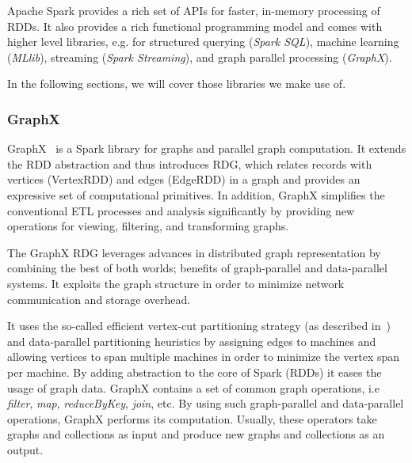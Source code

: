 Apache Spark provides a rich set of \gls{API}s for faster, in-memory processing of \gls{RDD}s.
It also provides a rich functional programming model and comes with higher level libraries, e.g. for structured querying (\textit{Spark SQL}), machine learning (\textit{MLlib}), streaming (\textit{Spark Streaming}), and graph parallel processing (\textit{GraphX}).

In the following sections, we will cover those libraries we make use of.

\subsubsection{GraphX}
GraphX~\cite{Gonzalez2014GraphX} is a Spark library for graphs and parallel graph computation.
It extends the \gls{RDD} abstraction and thus introduces \gls{RDG}, which relates records with vertices (VertexRDD) and edges (EdgeRDD) in a graph and provides an expressive set of computational primitives.
In addition, GraphX simplifies the conventional ETL processes and analysis significantly by providing new operations for viewing, filtering, and transforming graphs.

The GraphX \gls{RDG} leverages advances in distributed graph representation by combining the best of both worlds; benefits of graph-parallel and data-parallel systems.
It exploits the graph structure in order to minimize network communication and storage overhead.

It uses the so-called efficient vertex-cut partitioning strategy (as described in~\cite{Gonzalez2012PowerGraph}) and data-parallel partitioning heuristics by assigning edges to machines and allowing vertices to span multiple machines in order to minimize the vertex span per machine.
By adding abstraction to the core of Spark (\gls{RDD}s) it eases the usage of graph data.
GraphX contains a set of common graph operations, i.e \textit{filter}, \textit{map}, \textit{reduceByKey}, \textit{join}, etc.
By using such graph-parallel and data-parallel operations, GraphX performs its computation.
Usually, these operators take graphs and collections as input and produce new graphs and collections as an output.


